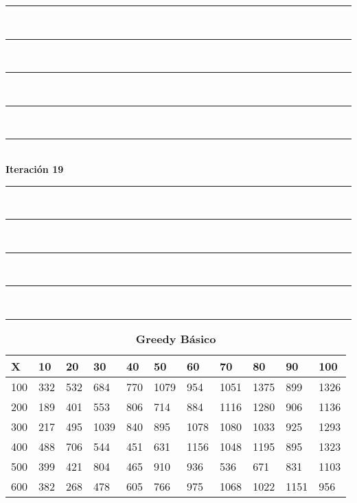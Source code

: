 \documentclass[10pt,letterpaper]{article}
\begin{document}
\newpage 
\begin{center}
\newcommand{\HRule}{\rule{\linewidth}{0.5mm}}
\center
\HRule\\[6cm]
\HRule\\[0.4cm]
\HRule\\[0.4cm]
\HRule\\[0.4cm]
\HRule\\[0.4cm]
{\centering \Huge\bfseries Iteración 19}\\[0.4cm]
\HRule\\[0.4cm]
\HRule\\[0.4cm]
\HRule\\[0.4cm]
\HRule\\[6cm]
\HRule
\end{center}
\newpage 
{}
\begin{center}
\begin{table}\renewcommand{\arraystretch}{2.5}
\caption{\large \textbf{Greedy Básico}}
\centering
\begin{tabular} { |m{0.5cm}|m{1.3cm}|m{1.3cm}|m{1.3cm}|m{1.3cm}|m{1.3cm}|m{1.3cm}|m{1.3cm}|m{1.3cm}|m{1.3cm}|m{1.3cm}|} 
\hline
\rowcolor{Gray}
\centering \textbf{X} & \centering \textbf{10} & \centering \textbf{20} & \centering \textbf{30}\ & \centering \textbf{40} & \centering \textbf{50} & \centering \textbf{60}\ & \centering \textbf{70} & \centering \textbf{80} & \centering \textbf{90}\ & \textbf{100} \\\hline
\cellcolor{Gray}100 & \Large 332 & \Large 532 & \Large 684 & \Large 770 & \Large 1079 & \Large 954 & \Large 1051 & \Large 1375 & \Large 899 & \Large 1326 \\
\hline
\cellcolor{Gray}200 & \Large 189 & \Large 401 & \Large 553 & \Large 806 & \Large 714 & \Large 884 & \Large 1116 & \Large 1280 & \Large 906 & \Large 1136 \\
\hline
\cellcolor{Gray}300 & \Large 217 & \Large 495 & \Large 1039 & \Large 840 & \Large 895 & \Large 1078 & \Large 1080 & \Large 1033 & \Large 925 & \Large 1293 \\
\hline
\cellcolor{Gray}400 & \Large 488 & \Large 706 & \Large 544 & \Large 451 & \Large 631 & \Large 1156 & \Large 1048 & \Large 1195 & \Large 895 & \Large 1323 \\
\hline
\cellcolor{Gray}500 & \Large 399 & \Large 421 & \Large 804 & \Large 465 & \Large 910 & \Large 936 & \Large 536 & \Large 671 & \Large 831 & \Large 1103 \\
\hline
\cellcolor{Gray}600 & \Large 382 & \Large 268 & \Large 478 & \Large 605 & \Large 766 & \Large 975 & \Large 1068 & \Large 1022 & \Large 1151 & \Large 956 \\

\end{tabular}
\end{table}
\end{center}
\end{document}
